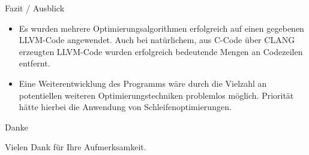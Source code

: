 \documentclass[ucs,9pt]{beamer}
\begin{document}
\begin{frame}{Fazit / Ausblick}
\begin{itemize}
\item Es wurden mehrere Optimierungsalgorithmen erfolgreich auf einen gegebenen LLVM-Code angewendet. Auch bei natürlichem, aus C-Code über CLANG erzeugten LLVM-Code wurden erfolgreich bedeutende Mengen an Codezeilen entfernt.
\vspace{3mm}
\item Eine Weiterentwicklung des Programms wäre durch die Vielzahl an potentiellen weiteren Optimierungstechniken problemlos möglich. Priorität hätte hierbei die Anwendung von Schleifenoptimierungen.
\end{itemize}
\end{frame}

\begin{frame}{Danke}
	\begin{center}
		\begin{Large}Vielen Dank für Ihre Aufmerksamkeit.\end{Large}
	\end{center}
\end{frame}

\end{document}
